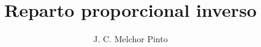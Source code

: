 \documentclass[12pt,addpoints,answers]{guia}
\title{Reparto proporcional inverso}
\author{J. C. Melchor Pinto}
\begin{document}
\pagestyle{headandfoot}

\INFO
\begin{questions}
    
    
    \newpage
    
\end{questions}

\end{document}

